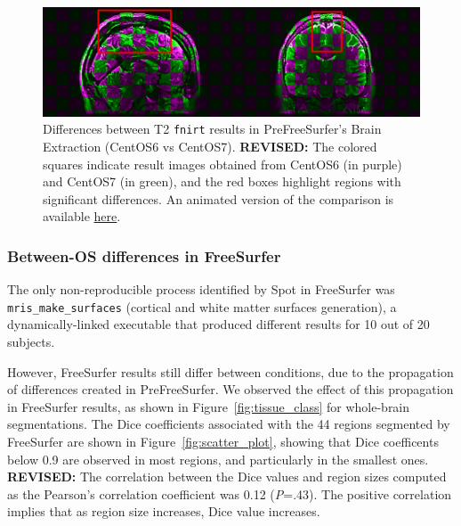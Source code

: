 \documentclass[a4paper,num-refs]{oup-contemporary}
\newcommand{\revised}[1]{\color{blue}\textbf{REVISED:}#1\color{black}}
\newcommand{\toolname}[0]{Spot\xspace}
\newcommand{\fnirt}[0]{\texttt{fnirt}\xspace}
\begin{document}
\begin{figure}
  \centering
    \includegraphics[width=\columnwidth]{figures/t2w_alignment.png} 
    \caption{Differences between T2 \fnirt results in PreFreeSurfer's Brain Extraction (CentOS6 vs 
    CentOS7). 
    \revised{
    The colored squares indicate result images obtained from CentOS6 (in purple) and CentOS7 (in green), 
    and the red boxes highlight regions with significant differences.}
    An animated version of the comparison is available \href{https://github.com/big-data-lab-team/HCP-reproducibility-paper/blob/master/figures/pfs_t2w_alignment.gif}{here}.}
    \label{fig:fnirt_result}
\end{figure}

\subsubsection{Between-OS differences in FreeSurfer} 

The only non-reproducible process identified by \toolname in FreeSurfer was
\texttt{mris\_make\_surfaces} (cortical and white matter surfaces
generation), a dynamically-linked executable 
that produced different results for
10 out of 20 subjects. 

However, FreeSurfer results still differ between conditions, due to the
propagation of differences created in PreFreeSurfer. We
observed the effect of this propagation in FreeSurfer results, as shown in
Figure~\ref{fig:tissue_class} for whole-brain segmentations. The
Dice coefficients associated with the 44 regions segmented by
FreeSurfer are shown in Figure~\ref{fig:scatter_plot}, showing that Dice coefficents below 0.9 are 
observed in most regions, and particularly in the smallest ones.
\revised{
The correlation between the Dice values and region sizes computed as the Pearson's correlation coefficient 
was 0.12 (\emph{P}=.43). 
The positive correlation implies that as region size increases, Dice value increases. 
}
\end{document}
